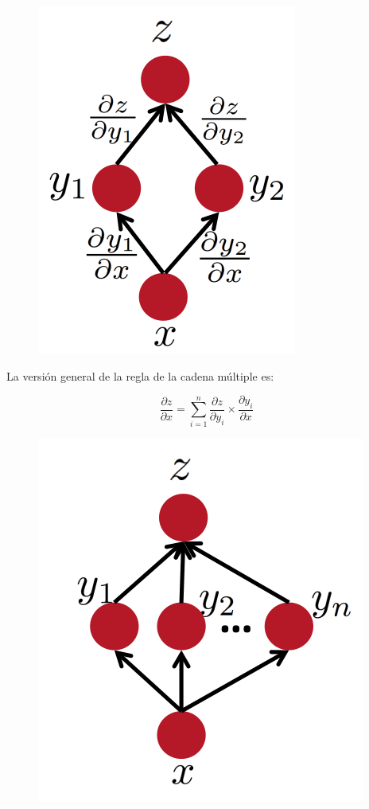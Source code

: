 \begin{figure}[htb]
	\centering
	 \includegraphics[scale=0.3]{pics/multiple_paths_chain_rule.png}
\end{figure}

La versión general de la regla de la cadena múltiple es:

\begin{displaymath}
 \frac{\partial z}{\partial x} = \sum_{i=1}^n \frac{\partial z}{\partial y_i} \times \frac{\partial y_i}{\partial x}
\end{displaymath}

\begin{figure}[htb]
	\centering
	 \includegraphics[scale=0.4]{pics/multiple_paths_chain_rule_general.png}
\end{figure}

